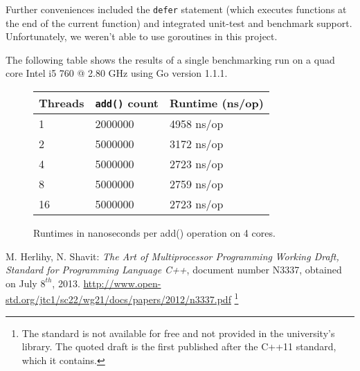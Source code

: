 \documentclass[a4paper,10pt]{article}
\begin{document}
Further conveniences included the \lstinline|defer| statement (which executes
functions at the end of the current function) and integrated unit-test and
benchmark support. Unfortunately, we weren't able to use goroutines in this
project.

The following table shows the results of a single benchmarking run on a
quad core Intel i5 760 @ 2.80 GHz using Go version 1.1.1.

\begin{figure}[H]
\centering
\begin{tabular}{lll}
\toprule
Threads & \lstinline|add()| count & Runtime (ns/op) \\
\midrule
1  &   2000000 &            4958 ns/op \\
2  &   5000000 &            3172 ns/op \\
4  &   5000000 &            2723 ns/op \\
8  &   5000000 &            2759 ns/op \\
16 &   5000000 &            2723 ns/op \\
\bottomrule
\end{tabular}
\caption{Runtimes in nanoseconds per add() operation on 4 cores.}
\label{fig:go}
\end{figure}

\begin{thebibliography}{9}
    M. Herlihy, N. Shavit:
   \emph{The Art of Multiprocessor Programming}
	\emph{Working Draft, Standard for Programming Language C++},
	document number N3337, obtained on July $8^{th}$, 2013.	
    \url{http://www.open-std.org/jtc1/sc22/wg21/docs/papers/2012/n3337.pdf}
	\footnote{The standard is not available for free and not provided in the
    university's  library. The quoted draft is the first published after the
    C++11 standard, which it contains.}

\end{thebibliography}
\end{document}
